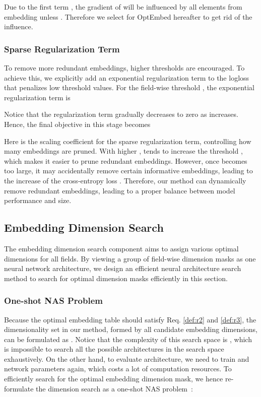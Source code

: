 \documentclass[sigconf]{acmart}
\begin{document}
Due to the first term , the gradient of  will be influenced by all elements from embedding  unless . Therefore we select  for OptEmbed hereafter to get rid of the influence.

\subsubsection{Sparse Regularization Term}

To remove more redundant embeddings, higher thresholds are encouraged. To achieve this, we explicitly add an exponential regularization term  to the logloss that penalizes low threshold values. For the field-wise threshold , the exponential regularization term is 


Notice that the regularization term gradually decreases to zero as  increases. Hence, the final objective in this stage becomes 


Here  is the scaling coefficient for the sparse regularization term, controlling how many embeddings are pruned. With higher ,  tends to increase the threshold , which makes it easier to prune redundant embeddings. However, once  becomes too large, it may accidentally remove certain informative embeddings, leading to the increase of the cross-entropy loss . Therefore, our method can dynamically remove redundant embeddings, leading to a proper balance between model performance and size. 

\subsection{Embedding Dimension Search}
\label{sec:embed_mask}


The embedding dimension search component aims to assign various optimal dimensions for all fields. By viewing a group of field-wise dimension masks as one neural network architecture, we design an efficient neural architecture search method to search for optimal dimension masks efficiently in this section.


\subsubsection{One-shot NAS Problem}

Because the optimal embedding table should satisfy Req. \ref{def:r2} and \ref{def:r3}, the dimensionality set in our method, formed by all candidate embedding dimensions, can be formulated as . Notice that the complexity of this search space is , which is impossible to search all the possible architectures in the search space exhaustively. On the other hand, to evaluate architecture, we need to train  and network parameters again, which costs a lot of computation resources. To efficiently search for the optimal embedding dimension mask, we hence re-formulate the dimension search as a one-shot NAS problem~\cite{One-shot,one-shotnas}:
\end{document}
